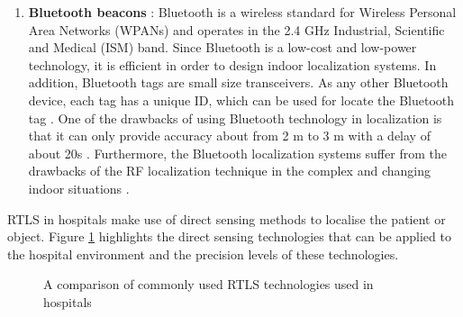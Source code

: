 \begin{enumerate}
                \item \textbf{Bluetooth beacons} : Bluetooth is a wireless standard for Wireless Personal Area Networks (WPANs) and operates in the 2.4 GHz Industrial, Scientific and Medical (ISM) band. Since Bluetooth is a low-cost and low-power technology, it is efficient in order to design indoor localization systems. In addition, Bluetooth tags are small size transceivers. As any other Bluetooth device, each tag has a unique ID, which can be used for locate the Bluetooth tag \cite{mainetti2014Indoorlit}. One of the drawbacks of using Bluetooth technology in localization is that it can only provide accuracy about from 2 m to 3 m with a delay of about 20s \cite{mainetti2014Indoorlit}. Furthermore, the Bluetooth localization systems suffer from the drawbacks of the RF localization technique in the complex and changing indoor situations \cite{fallah2013indoor}.

			\end{enumerate}
             
             RTLS in hospitals make use of direct sensing methods to localise the patient or object. Figure \ref{fig:litRev_RTLSdirectSensing} highlights the direct sensing technologies that can be applied to the hospital environment and the precision levels of these technologies.
                         
            \begin{figure}[htpb!]
                \centering
                \caption{ A comparison of commonly used RTLS technologies used in hospitals \cite{Dsouza2011emergency}}
                \label{fig:litRev_RTLSdirectSensing}
          	  \end{figure}

